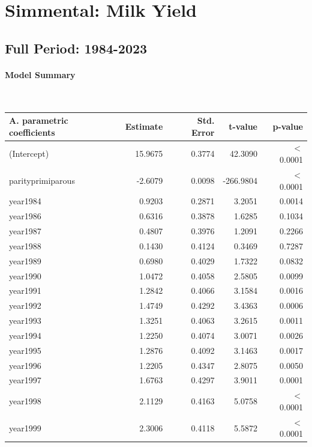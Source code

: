 \section{Simmental: Milk Yield}
\subsection{Full Period: 1984-2023}\label{model:si_milk_full}
\paragraph{Model Summary} \quad \\


    \begin{table}[H]
    \centering
    \begin{tabular}{lrrrr}
    \textbf{A. parametric coefficients} & Estimate & Std. Error & t-value & p-value \\ 
       \hline
       \hline
      (Intercept) & 15.9675 & 0.3774 & 42.3090 & $<$ 0.0001 \\ 
      parityprimiparous & -2.6079 & 0.0098 & -266.9804 & $<$ 0.0001 \\ 
      year1984 & 0.9203 & 0.2871 & 3.2051 & 0.0014 \\ 
      year1986 & 0.6316 & 0.3878 & 1.6285 & 0.1034 \\ 
      year1987 & 0.4807 & 0.3976 & 1.2091 & 0.2266 \\ 
      year1988 & 0.1430 & 0.4124 & 0.3469 & 0.7287 \\ 
      year1989 & 0.6980 & 0.4029 & 1.7322 & 0.0832 \\ 
      year1990 & 1.0472 & 0.4058 & 2.5805 & 0.0099 \\ 
      year1991 & 1.2842 & 0.4066 & 3.1584 & 0.0016 \\ 
      year1992 & 1.4749 & 0.4292 & 3.4363 & 0.0006 \\ 
      year1993 & 1.3251 & 0.4063 & 3.2615 & 0.0011 \\ 
      year1994 & 1.2250 & 0.4074 & 3.0071 & 0.0026 \\ 
      year1995 & 1.2876 & 0.4092 & 3.1463 & 0.0017 \\ 
      year1996 & 1.2205 & 0.4347 & 2.8075 & 0.0050 \\ 
      year1997 & 1.6763 & 0.4297 & 3.9011 & 0.0001 \\ 
      year1998 & 2.1129 & 0.4163 & 5.0758 & $<$ 0.0001 \\ 
      year1999 & 2.3006 & 0.4118 & 5.5872 & $<$ 0.0001 \\ 

\end{tabular}
\end{table}

